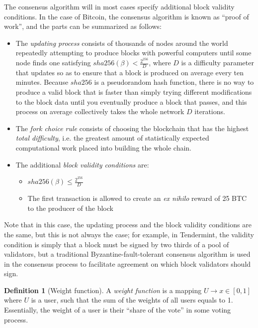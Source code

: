 \documentclass[11pt,a4paper]{article}
\makeatletter
\theoremstyle{plain}
\theoremstyle{definition}
\newtheorem{defn}{Definition}[section]
\theoremstyle{remark}
\newcommand{\ie}{i.e.\@\xspace}
\makeatother
\begin{document}
The consensus algorithm will in most cases specify additional block validity conditions. In the case of Bitcoin, the consensus algorithm is known as ``proof of work'', and the parts can be summarized as follows:

\begin{itemize}
\item
The \emph{updating process} consists of thousands of nodes around the world repeatedly attempting to produce blocks with powerful computers until some node finds one satisfying $sha256(\beta) < \frac{2^{256}}{D}$\cite{sha256}, where $D$ is a difficulty parameter that updates so as to ensure that a block is produced on average every ten minutes. Because $sha256$ is a pseudorandom hash function, there is no way to produce a valid block that is faster than simply trying different modifications to the block data until you eventually produce a block that passes, and this process on average collectively takes the whole network $D$ iterations.
\item
The \emph{fork choice rule} consists of choosing the blockchain that has the highest \emph{total difficulty}, \ie the greatest amount of statistically expected computational work placed into building the whole chain.
\item
The additional \emph{block validity conditions} are:
    \begin{itemize}
    \item
    $sha256(\beta) \le \frac{2^{256}}{D}$
    \item
    The first transaction is allowed to create an \emph{ex nihilo} reward of 25 BTC to the producer of the block
    \end{itemize}
\end{itemize}

Note that in this case, the updating process and the block validity conditions are the same, but this is not always the case; for example, in Tendermint\cite{tendermint}, the validity condition is simply that a block must be signed by two thirds of a pool of validators, but a traditional Byzantine-fault-tolerant consensus algorithm is used in the consensus process to facilitate agreement on which block validators should sign.

\begin{defn}[Weight function]
A \emph{weight function} is a mapping $U \rightarrow x \in [0,1]$ where $U$ is a user, such that the sum of the weights of all users equals to 1. Essentially, the weight of a user is their ``share of the vote'' in some voting process.
\end{defn}
\end{document}
